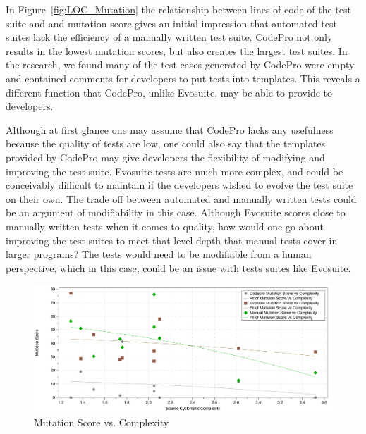 \documentclass[conference]{IEEEtran}
\begin{document}
In Figure~\ref{fig:LOC_Mutation} the relationship between lines of code of the test suite and and mutation score gives an initial impression that automated test suites lack the efficiency of a manually written test suite. CodePro not only results in the lowest mutation scores, but also creates the largest test suites. In the research, we found many of the test cases generated by CodePro were empty and contained comments for developers to put tests into templates. This reveals a different function that CodePro, unlike Evosuite, may be able to provide to developers. 

Although at first glance one may assume that CodePro lacks any usefulness because the quality of tests are low, one could also say that the templates provided by CodePro may give developers the flexibility of modifying and improving the test suite. Evosuite tests are much more complex, and could be conceivably difficult to maintain if the developers wished to evolve the test suite on their own. The trade off between automated and manually written tests could be an argument of modifiability in this case. Although Evosuite scores close to manually written tests when it comes to quality, how would one go about improving the test suites to meet that level depth that manual tests cover in larger programs? The tests would need to be modifiable from a human perspective, which in this case, could be an issue with tests suites like Evosuite.

\begin{figure}[!t]
\centering
  \includegraphics[width=\textwidth]{Complexity_Mutation}
    \caption{Mutation Score vs. Complexity}
  \label{fig:Complexity_Mutation}
\end{figure}
\end{document}
